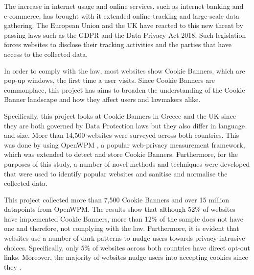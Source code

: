 \documentclass[../main.tex]{subfiles}
\begin{document}
The increase in internet usage and online services, such as internet banking and e-commerce, has brought with it extended online-tracking and large-scale data gathering. The European Union and the UK have reacted to this new threat by passing laws such as the GDPR and the Data Privacy Act 2018. Such legislation forces websites to disclose their tracking activities and the parties that have access to the collected data. 

In order to comply with the law, most websites show Cookie Banners, which are pop-up windows, the first time a user visits. Since Cookie Banners are commonplace, this project has aims to broaden the understanding of the Cookie Banner landscape and how they affect users and lawmakers alike.

Specifically, this project looks at Cookie Banners in Greece and the UK since they are both governed by Data Protection laws but they also differ in language and size. More than 14,500 websites were surveyed across both countries. This was done by using OpenWPM \cite{englehardt2016online}, a popular web-privacy measurement framework, which was extended to detect and store Cookie Banners. Furthermore, for the purposes of this study, a number of novel methods and techniques were developed that were used to identify popular websites and sanitise and normalise the collected data.

This project collected more than 7,500 Cookie Banners and over 15 million datapoints from OpenWPM. The results show that although 52\% of websites have implemented Cookie Banners, more than 12\% of the sample does not have one and therefore, not complying with the law. Furthermore, it is evident that websites use a number of dark patterns to nudge users towards privacy-intrusive choices. Specifically, only 5\% of websites across both countries have direct opt-out links. Moreover, the majority of websites nudge users into accepting cookies since they .
\end{document}

